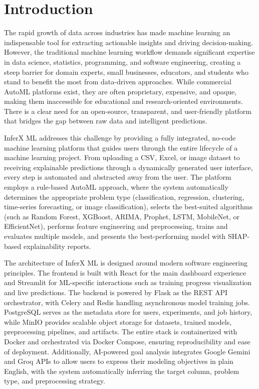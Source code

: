 \chapter{Introduction}
\hspace{0.5cm}The rapid growth of data across industries has made machine learning an indispensable tool for extracting actionable insights and driving decision-making. However, the traditional machine learning workflow demands significant expertise in data science, statistics, programming, and software engineering, creating a steep barrier for domain experts, small businesses, educators, and students who stand to benefit the most from data-driven approaches. While commercial AutoML platforms exist, they are often proprietary, expensive, and opaque, making them inaccessible for educational and research-oriented environments. There is a clear need for an open-source, transparent, and user-friendly platform that bridges the gap between raw data and intelligent predictions.\vspace{0.3cm}

InferX ML addresses this challenge by providing a fully integrated, no-code machine learning platform that guides users through the entire lifecycle of a machine learning project. From uploading a CSV, Excel, or image dataset to receiving explainable predictions through a dynamically generated user interface, every step is automated and abstracted away from the user. The platform employs a rule-based AutoML approach, where the system automatically determines the appropriate problem type (classification, regression, clustering, time-series forecasting, or image classification), selects the best-suited algorithms (such as Random Forest, XGBoost, ARIMA, Prophet, LSTM, MobileNet, or EfficientNet), performs feature engineering and preprocessing, trains and evaluates multiple models, and presents the best-performing model with SHAP-based explainability reports.\vspace{0.3cm}

The architecture of InferX ML is designed around modern software engineering principles. The frontend is built with React for the main dashboard experience and Streamlit for ML-specific interactions such as training progress visualization and live predictions. The backend is powered by Flask as the REST API orchestrator, with Celery and Redis handling asynchronous model training jobs. PostgreSQL serves as the metadata store for users, experiments, and job history, while MinIO provides scalable object storage for datasets, trained models, preprocessing pipelines, and artifacts. The entire stack is containerized with Docker and orchestrated via Docker Compose, ensuring reproducibility and ease of deployment. Additionally, AI-powered goal analysis integrates Google Gemini and Groq APIs to allow users to express their modeling objectives in plain English, with the system automatically inferring the target column, problem type, and preprocessing strategy.\vspace{0.3cm}

